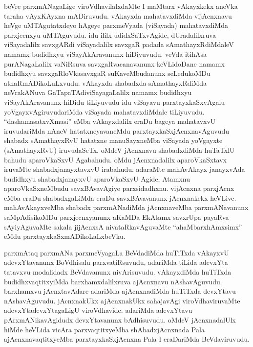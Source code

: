 
\begin{artha}
beVre parxmANagaLige viroVdhavilalxdaMte I maMtarx vAkayxkekx aneVka taraha vAyxKAyxna mADiruvudu. vAkayxda mahatavxdiMda vijAcnxnavu heVge uMTAgutatxdeyo hAgeye parxmeVyada (viSayada) mahatavxdiMda parxjecnxyu uMTAguvudu. idu ililx udidxSaTxvAgide, dUradalilxruva viSayadalilx savxgARdi viSayadalilx savxgaR padada sAmathayxRdiMdaleV namamx budidhxyu viSayAkAravanunx hiDiyuvudu. veVda itihAsa purANagaLalilx vaNiRsuva savxgaRvacanavanunx keVLidoDane namamx budidhxyu savxgaRloVkasavxgaR suKaveMbudanunx seLedukoMDu athaRmADikoLuLxvudu. vAkayxda shabadxda sAmathayxRdiMda neVrakANuva GaTapaTAdiviSayagaLalilx namamx budidhxyu viSayAkAravanunx hiDidu tiLiyuvudu idu viSayavu parxtayxkaSxvAgalu yoVgayxvAgiruvudariMda viSayada mahatavxdiMdale tiLiyuvudu. ``dashamasatxvXmasi'' eMba vAkayxdalilx eraDu bageya mahatavxvU iruvudariMda nAneV hatatxneyavaneMdu parxtayxkaSxjAcnxnavAguvudu shabadx sAmathayxRvU hatatxne manuSayxneMba viSayada yoVgayxte (sAmathayxRvU) iruvudaSeTx. oMdeV jAcnxnavu shabadxdiMda huTaTxlU bahudu aparoVkaSxvU Agabahudu. oMdu jAcnxnadalilx aparoVkaSxtavx iruvaMte shabadxjanayxtavxvU irabahudu. adaraMte mahAvAkayx janayxvAda budidhxyu shabadxjanayxvU aparoVkaSxvU Agide, Atamxnu aparoVkaSxneMbudu savxBAvavAgiye parxsidadhxnu. vijAcnxna parxjAcnx eMba eraDu shabadxgaLiMda eraDu savxBAvavanunx jAcnxnakekx heVLive. mahAvAkayxveMba shabadx parxmANadiMda jAcnxnaveMba parxmANavanunx saMpAdisikoMDu parxjecnxyanunx aKaMDa EkAtamx savxrUpa payaRva sAyiyAguvaMte sakala jijAcnxsA nivataRkavAguvaMte  ``ahaMbarxhAmxsimx'' eMdu parxtayxkaSxmADikoLaLxbeVku.

parxmAtaq parxmANa parxmeVyagaLa BeVdadiMda huTiTxda vAkayxvU adevxYtavanunx BoVdhisalu parxvatiRsuvudu, adariMda tiLida adevxYta tatavxvu modalidadx BeVdavanunx nivArisuvudu. vAkayxdiMda huTiTxda budidhxvaqtitxyiMda barxhamxdalilxruva ajAcnxnavu nAshavAguvudu. barxhamxvu jAcnxtavAdare adariMda ajAcnxnadiMda huTiTxda devxYtavu nAshavAguvudu. jAcnxnakUkx ajAcnxnakUkx sahajavAgi viroVdhaviruvaMte adevxYtadevxYtagaLigU viroVdhavide. adariMda adevxYtavu pArxmANikavAgidudx devxYtavanunx bAdhisuvudu. oMdeV jAcnxnadalUlx hiMde heVLida vicAra parxvaqtitxyeMba shAbadxjAcnxnada Pala ajAcnxnavaqtitxyeMba parxtayxkaSxjAcnxna Pala I eraDariMda BeVdaviruvudu.
\end{artha}


